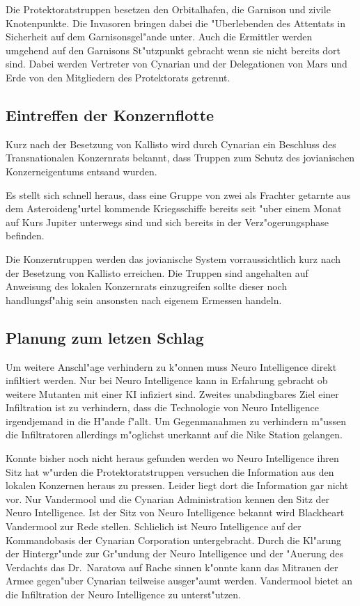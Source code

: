 Die Protektoratstruppen besetzen den Orbitalhafen, die Garnison und zivile Knotenpunkte. Die Invasoren bringen dabei die "Uberlebenden des Attentats in Sicherheit auf dem Garnisonsgel"ande unter. Auch die Ermittler werden umgehend auf den Garnisons St"utzpunkt gebracht wenn sie nicht bereits dort sind. Dabei werden Vertreter von Cynarian und der Delegationen von Mars und Erde von den Mitgliedern des Protektorats getrennt.

\subsection{Eintreffen der Konzernflotte}

Kurz nach der Besetzung von Kallisto wird durch Cynarian ein Beschluss des Transnationalen Konzernrats bekannt, dass Truppen zum Schutz des jovianischen Konzerneigentums entsand wurden.

Es stellt sich schnell heraus, dass eine Gruppe von zwei als Frachter getarnte aus dem Asteroideng"urtel kommende Kriegsschiffe bereits seit "uber einem Monat auf Kurs Jupiter unterwegs sind und sich bereits in der Verz"ogerungsphase befinden.

Die Konzerntruppen werden das jovianische System vorraussichtlich kurz nach der Besetzung von Kallisto erreichen. Die Truppen sind angehalten auf Anweisung des lokalen Konzernrats einzugreifen sollte dieser noch handlungsf"ahig sein ansonsten nach eigenem Ermessen handeln.

\subsection{Planung zum letzen Schlag}

Um weitere Anschl"age verhindern zu k"onnen muss Neuro Intelligence direkt infiltiert werden. Nur bei Neuro Intelligence kann in Erfahrung gebracht ob weitere Mutanten mit einer KI infiziert sind. Zweites unabdingbares Ziel einer Infiltration ist zu verhindern, dass die Technologie von Neuro Intelligence irgendjemand in die H"ande f"allt. Um Gegenma\3nahmen zu verhindern m"ussen die Infiltratoren allerdings m"oglichst unerkannt auf die Nike Station gelangen.

Konnte bisher noch nicht heraus gefunden werden wo Neuro Intelligence ihren Sitz hat w"urden die Protektoratstruppen versuchen die Information aus den lokalen Konzernen heraus zu pressen. Leider liegt dort die Information gar nicht vor. Nur Vandermool und die Cynarian Administration kennen den Sitz der Neuro Intelligence. Ist der Sitz von Neuro Intelligence bekannt wird Blackheart Vandermool zur Rede stellen. Schlie\3lich ist Neuro Intelligence auf der Kommandobasis der Cynarian Corporation untergebracht. Durch die Kl"arung der Hintergr"unde zur Gr"undung der Neuro Intelligence und der "Au\3erung des Verdachts das Dr.~Naratova auf Rache sinnen k"onnte kann das Mi\3trauen der Armee gegen"uber Cynarian teilweise ausger"aumt werden. Vandermool bietet an die Infiltration der Neuro Intelligence zu unterst"utzen.

